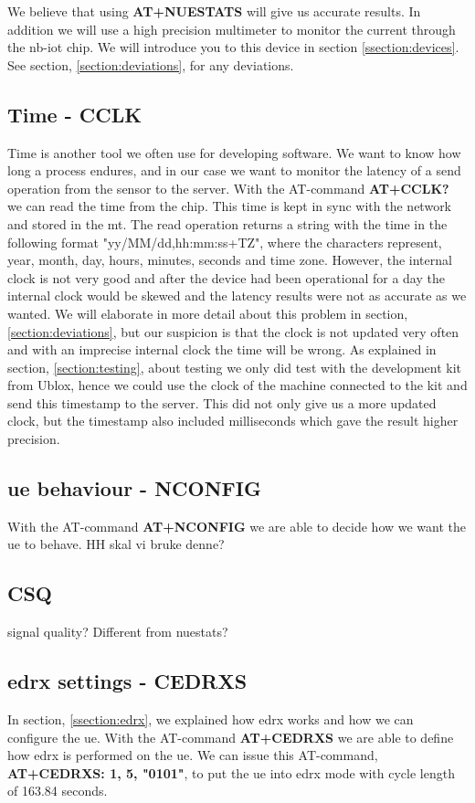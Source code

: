 \documentclass[USenglish]{ifimaster}  %
\begin{document}
We believe that using \textbf{AT+NUESTATS} will give us accurate results. In addition we will use a high precision multimeter to monitor the current through the \acrshort{nb-iot} chip. We will introduce you to this device in section \vref{ssection:devices}. See section, \vref{section:deviations}, for any deviations.

\subsection{Time - CCLK}
Time is another tool we often use for developing software. We want to know how long a process endures, and in our case we want to monitor the latency of a send operation from the sensor to the server. With the AT-command \textbf{AT+CCLK?} we can read the time from the chip. This time is kept in sync with the network and stored in the \acrshort{mt}. The read operation returns a string with the time in the following format "yy/MM/dd,hh:mm:ss+TZ", where the characters represent, year, month, day, hours, minutes, seconds and time zone. However, the internal clock is not very good and after the device had been operational for a day the internal clock would be skewed and the latency results were not as accurate as we wanted. We will elaborate in more detail about this problem in section, \vref{section:deviations}, but our suspicion is that the clock is not updated very often and with an imprecise internal clock the time will be wrong. As explained in section, \vref{section:testing}, about testing we only did test with the development kit from Ublox, hence we could use the clock of the machine connected to the kit and send this timestamp to the server. This did not only give us a more updated clock, but the timestamp also included milliseconds which gave the result higher precision.

\subsection{\acrshort{ue} behaviour - NCONFIG}
With the AT-command \textbf{AT+NCONFIG} we are able to decide how we want the \acrshort{ue} to behave. HH skal vi bruke denne?

\subsection{CSQ} signal quality? Different from nuestats?

\subsection{\acrshort{edrx} settings - CEDRXS}
In section, \vref{ssection:edrx}, we explained how \acrshort{edrx} works and how we can configure the \acrshort{ue}. With the AT-command \textbf{AT+CEDRXS} we are able to define how \acrshort{edrx} is performed on the \acrshort{ue}. We can issue this AT-command, \textbf{AT+CEDRXS: 1, 5, "0101"}, to put the \acrshort{ue} into \acrshort{edrx} mode with cycle length of 163.84 seconds.
\end{document}
